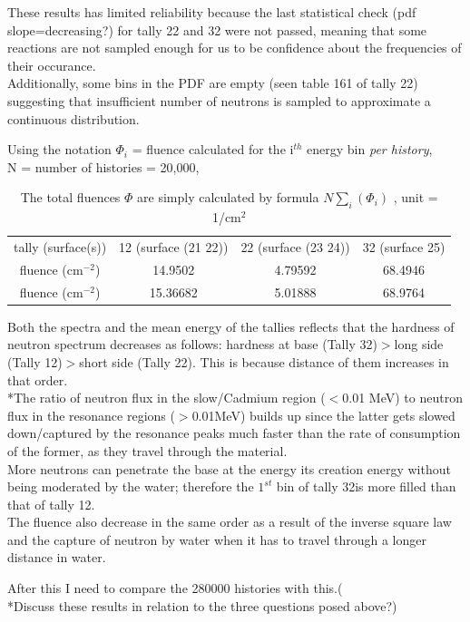 \documentclass[a4paper, 12pt]{article}
\begin{document}
\begin{compactenum}
	\item These results has limited reliability because the last statistical check (pdf slope=decreasing?) for tally 22 and 32 were not passed, meaning that some reactions are not sampled enough for us to be confidence about the frequencies of their occurance.
	\\Additionally, some bins in the PDF are empty (seen table 161 of tally 22) suggesting that insufficient number of neutrons is sampled to approximate a continuous distribution.
	\item Using the notation $\Phi_i$ = fluence calculated for the i${}^{th}$ energy bin \emph{per history},
	\\N = number of histories = 20,000,
	\begin{table}[H]
		\centering
		\begin{tabular}{cccc}
			tally (surface(s)) & 12 (surface (21 22)) & 22 (surface (23 24)) & 32 (surface 25)	\\
			fluence (cm$^{-2}$) &14.9502  & 4.79592 & 68.4946 \\
			fluence (cm$^{-2}$) &15.36682 & 5.01888 & 68.9764
		\end{tabular}
		\caption{ The total fluences $\Phi$ are simply calculated by formula $N \sum\limits_i (\Phi_i)$ , unit = 1/cm${}^{2}$
		}\label{Ex1Fluences}
	\end{table}
	\item Both the spectra and the mean energy of the tallies reflects that the hardness of neutron spectrum decreases as follows: hardness at base (Tally 32)$>$long side (Tally 12)$>$short side (Tally 22).
	This is because distance of them increases in that order.
	\\*The ratio of neutron flux in the slow/Cadmium region ($<$0.01 MeV) to neutron flux in the resonance regions ($>$0.01MeV) builds up since the latter gets slowed down/captured by the resonance peaks much faster than the rate of consumption of the former, as they travel through the material.
	\\More neutrons can penetrate the base at the energy its creation energy without being moderated by the water; therefore the $1^{st}$ bin of tally 32is more filled than that of tally 12. 
	\\The fluence also decrease in the same order as a result of the inverse square law and the capture of neutron by water when it has to travel through a longer distance in water.
\end{compactenum}
After this I need to compare the 280000 histories with this.(\\*Discuss these results in relation to the three questions posed above?)
\end{document}
